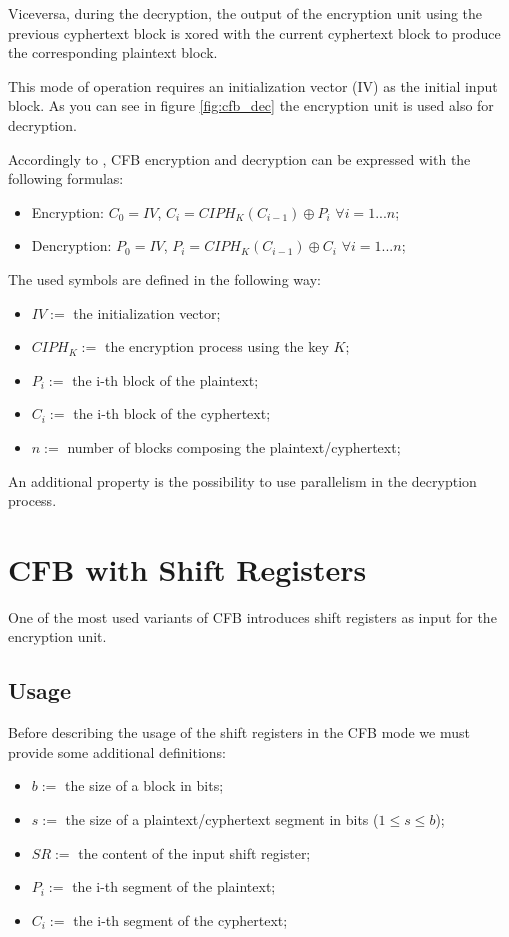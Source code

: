 \documentclass[11pt]{article}
\newcommand\CIPH{C\!I\!P\!H_K}
\begin{document}
Viceversa, during the decryption, the output of the encryption unit using the previous cyphertext block is xored with the current cyphertext block to produce the corresponding plaintext block.

This mode of operation requires an initialization vector (IV) as the initial input block. As you can see in figure \ref{fig:cfb_dec} the encryption unit is used also for decryption.

Accordingly to \cite{wiki}, CFB encryption and decryption can be expressed with the following formulas:

\begin{itemize}
\item Encryption: $C_0 = IV$, $C_i = \CIPH(C_{i-1}) \oplus P_i$ $\forall i = 1...n$;
\item Dencryption: $P_0 = IV$, $P_i = \CIPH(C_{i-1}) \oplus C_i$ $\forall i = 1...n$;
\end{itemize}

The used symbols are defined in the following way:

\begin{itemize}
\item $IV := $ the initialization vector;
\item $\CIPH := $ the encryption process using the key $K$;
\item $P_i := $ the i-th block of the plaintext;
\item $C_i := $ the i-th block of the cyphertext;
\item $n := $ number of blocks composing the plaintext/cyphertext;
\end{itemize}

An additional property is the possibility to use parallelism in the decryption process. 

\section{CFB with Shift Registers}

One of the most used variants of CFB introduces shift registers as input for the encryption unit.

\subsection{Usage}

Before describing the usage of the shift registers in the CFB mode we must provide some additional definitions:

\begin{itemize}
\item $b := $ the size of a block in bits;
\item $s := $ the size of a plaintext/cyphertext segment in bits ($1 \le s \le b$);
\item $SR := $ the content of the input shift register;
\item $P_i := $ the i-th segment of the plaintext;
\item $C_i := $ the i-th segment of the cyphertext;
\end{itemize}
\end{document}
